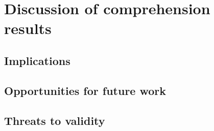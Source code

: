 \section{Discussion of comprehension results}
\subsection{Implications}
\subsection{Opportunities for future work}
\subsection{Threats to validity}

